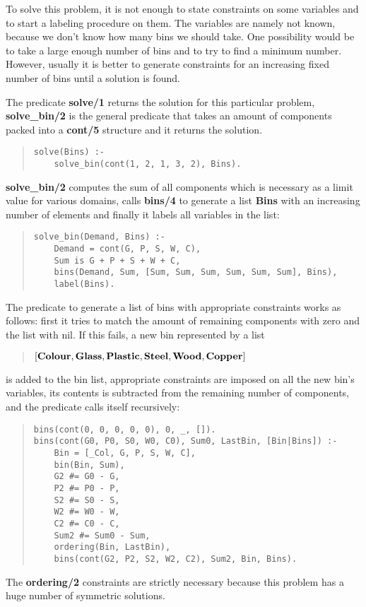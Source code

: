 To solve this problem, it is not enough to state constraints on some
variables and to start a labeling procedure on them.
The variables are namely not known, because we don't know how many
bins we should take.
One possibility would be to take a large enough number of bins
and to try to find a minimum number.
However, usually it is better to generate constraints
for an increasing fixed number of bins until a solution is found.

The predicate {\bf solve/1} returns the solution for this
particular problem, {\bf solve_bin/2} is the general predicate
that takes an amount of components packed into a {\bf cont/5}
structure and it returns the solution.
\begin{quote}
\begin{verbatim}
solve(Bins) :-
    solve_bin(cont(1, 2, 1, 3, 2), Bins).
\end{verbatim}
\end{quote}

{\bf solve_bin/2} computes the sum of all components which is necessary
as a limit value for various domains, calls {\bf bins/4} to
generate a list {\bf Bins} with an increasing number of elements
and finally it labels all variables in the list:
\begin{quote}
\begin{verbatim}
solve_bin(Demand, Bins) :-
    Demand = cont(G, P, S, W, C),
    Sum is G + P + S + W + C,
    bins(Demand, Sum, [Sum, Sum, Sum, Sum, Sum, Sum], Bins),
    label(Bins).
\end{verbatim}
\end{quote}

The predicate to generate a list of bins with appropriate
constraints works as follows:
first it tries to match the amount of remaining components with zero
and the list with nil.
If this fails, a new bin represented by a list
\begin{quote}
${\bf [Colour, Glass, Plastic, Steel, Wood, Copper]}$
\end{quote}
is added to the bin list,
appropriate constraints are imposed on all the new bin's
variables,
its contents is subtracted from the remaining number of components,
and the predicate calls itself recursively:

\begin{quote}
\begin{verbatim}
bins(cont(0, 0, 0, 0, 0), 0, _, []).
bins(cont(G0, P0, S0, W0, C0), Sum0, LastBin, [Bin|Bins]) :-
    Bin = [_Col, G, P, S, W, C],
    bin(Bin, Sum),
    G2 #= G0 - G,
    P2 #= P0 - P,
    S2 #= S0 - S,
    W2 #= W0 - W,
    C2 #= C0 - C,
    Sum2 #= Sum0 - Sum,
    ordering(Bin, LastBin),
    bins(cont(G2, P2, S2, W2, C2), Sum2, Bin, Bins).
\end{verbatim}
\end{quote}
The {\bf ordering/2} constraints are strictly necessary because
this problem has a huge number of symmetric solutions.

